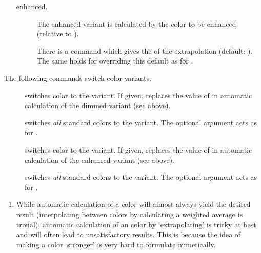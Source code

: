 \begin{slide}
\begin{enumerate}
\begin{description}
      \newslide

    \item[enhanced.] The enhanced variant is calculated by  the color to be enhanced (relative to
      ).

      There is a command 
      which gives the  of the extrapolation (default: ).
      The same holds for overriding this default as for .
    \end{description}
  \end{enumerate}

  \newslide

  The following commands switch color variants:
  \begin{description}
  \item[]
     switches color  to the 
    variant. If given,  replaces the value of  in automatic calculation of the dimmed
    variant (see above).

  \item[]
     switches \emph{all} standard colors to the 
    variant. The optional argument  acts as for .

    \newslide

  \item[]
     switches color  to the
     variant. If given,  replaces the value of  in automatic
    calculation of the enhanced variant (see above).

  \item[]
     switches \emph{all} standard colors to the
     variant. The optional argument  acts as for .
  \end{description}

  \newslide

  \begin{enumerate}
  \item While automatic calculation of a  color will almost always yield the desired result
    (interpolating between colors by calculating a weighted average is trivial), automatic calculation of an
     color by `extrapolating' is tricky at best and will often lead to unsatisfactory results. This is
    because the idea of making a color `stronger' is very hard to formulate numerically.


\end{enumerate}
\end{slide}
